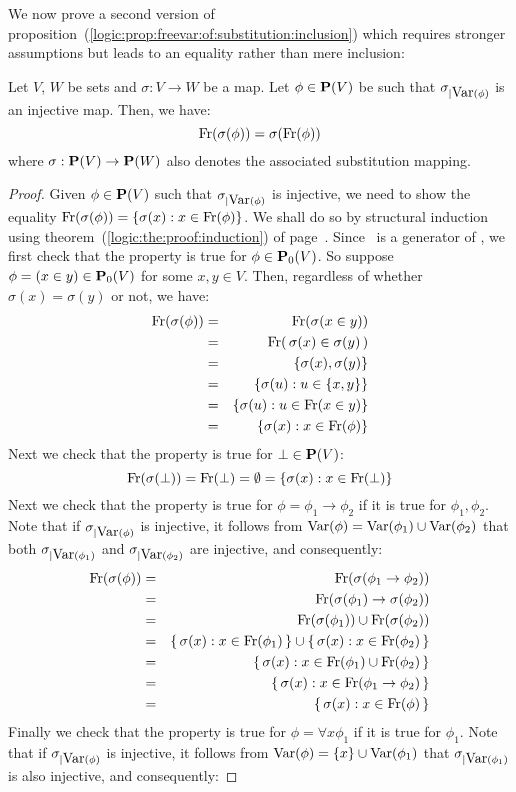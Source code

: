 We now prove a second version of
proposition~(\ref{logic:prop:freevar:of:substitution:inclusion})
which requires stronger assumptions but leads to an equality rather
than mere inclusion:
\begin{prop}\label{logic:prop:freevar:of:substitution}
    Let $V$, $W$ be sets and $\sigma:V\to W$ be a map. Let $\phi\in\mbox{${\bf P}(V)$}$ 
    be such that $\sigma_{|\mbox{\rm Var}(\phi)}$ is an injective map. Then, we have:
    \[
        \mbox{\rm Fr}(\sigma(\phi))=\sigma(\mbox{\rm Fr}(\phi))
    \]
    where $\sigma:\mbox{${\bf P}(V)$}\to{\bf P}(W)$ also denotes the associated substitution 
    mapping.
\end{prop}
\begin{proof}
Given $\phi\in\mbox{${\bf P}(V)$}$ such that $\sigma_{|\mbox{\rm Var}(\phi)}$ is injective, we
need to show the equality
$\mbox{\rm Fr}(\sigma(\phi))=\{\sigma(x):x\in\mbox{\rm Fr}(\phi)\}$. We shall do so
by structural induction using
theorem~(\ref{logic:the:proof:induction}) of
page~\pageref{logic:the:proof:induction}. Since \pvo\ is a generator
of \pv, we first check that the property is true for $\phi\in\mbox{${\bf P}_{0}(V)$}$.
So suppose $\phi=(x\in y)\in\mbox{${\bf P}_{0}(V)$}$ for some $x,y\in V$. Then,
regardless of whether $\sigma(x)=\sigma(y)$ or not, we have:
    \begin{eqnarray*}
    \mbox{\rm Fr}(\sigma(\phi))&=&\mbox{\rm Fr}(\sigma(x\in y))\\
    &=&\mbox{\rm Fr}(\,\sigma(x)\in\sigma(y)\,)\\
    &=&\{\sigma(x),\sigma(y)\}\\
    &=&\{\sigma(u):u\in\{x,y\}\}\\
    &=&\{\sigma(u):u\in\mbox{\rm Fr}(x\in y)\}\\
    &=&\{\sigma(x):x\in\mbox{\rm Fr}(\phi)\}
    \end{eqnarray*}
Next we check that the property is true for $\bot\in\mbox{${\bf P}(V)$}$:
    \[
    \mbox{\rm Fr}(\sigma(\bot))=\mbox{\rm Fr}(\bot)=\emptyset=\{\sigma(x):x\in\mbox{\rm Fr}(\bot)\}
    \]
Next we check that the property is true for
$\phi=\phi_{1}\to\phi_{2}$ if it is true for $\phi_{1},\phi_{2}$.
Note that if $\sigma_{|\mbox{\rm Var}(\phi)}$ is injective, it follows from
$\mbox{\rm Var}(\phi)=\mbox{\rm Var}(\phi_{1})\cup\mbox{\rm Var}(\phi_{2})$ that both
$\sigma_{|\mbox{\rm Var}(\phi_{1})}$ and $\sigma_{|\mbox{\rm Var}(\phi_{2})}$ are
injective, and consequently:
    \begin{eqnarray*}
    \mbox{\rm Fr}(\sigma(\phi))&=&\mbox{\rm Fr}(\sigma(\phi_{1}\to\phi_{2}))\\
    &=&\mbox{\rm Fr}(\sigma(\phi_{1})\to\sigma(\phi_{2}))\\
    &=&\mbox{\rm Fr}(\sigma(\phi_{1}))\cup\mbox{\rm Fr}(\sigma(\phi_{2}))\\
    &=&\{\,\sigma(x):x\in\mbox{\rm Fr}(\phi_{1})\,\}\cup\{\,\sigma(x):x\in\mbox{\rm Fr}(\phi_{2})\,\}\\
    &=&\{\,\sigma(x):x\in\mbox{\rm Fr}(\phi_{1})\cup\mbox{\rm Fr}(\phi_{2})\,\}\\
    &=&\{\,\sigma(x):x\in\mbox{\rm Fr}(\phi_{1}\to\phi_{2})\,\}\\
    &=&\{\,\sigma(x):x\in\mbox{\rm Fr}(\phi)\,\}
    \end{eqnarray*}
Finally we check that the property is true for $\phi=\forall
x\phi_{1}$ if it is true for $\phi_{1}$. Note that if
$\sigma_{|\mbox{\rm Var}(\phi)}$ is injective, it follows from
$\mbox{\rm Var}(\phi)=\{x\}\cup\mbox{\rm Var}(\phi_{1})$ that $\sigma_{|\mbox{\rm Var}(\phi_{1})}$
is also injective, and consequently:


\end{proof}
